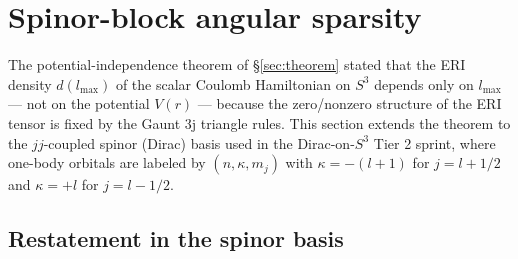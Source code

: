 
\section{Spinor-block angular sparsity}
\label{sec:paper22_spinor}

The potential-independence theorem of \S\ref{sec:theorem} stated that
the ERI density $d(l_{\max})$ of the scalar Coulomb Hamiltonian on
$S^3$ depends only on $l_{\max}$ --- not on the potential $V(r)$ ---
because the zero/nonzero structure of the ERI tensor is fixed by the
Gaunt 3j triangle rules. This section extends the theorem to the
$jj$-coupled spinor (Dirac) basis used in the Dirac-on-$S^3$ Tier 2
sprint, where one-body orbitals are labeled by $(n, \kappa, m_j)$ with
$\kappa = -(l+1)$ for $j = l + 1/2$ and $\kappa = +l$ for $j = l - 1/2$.

\subsection{Restatement in the spinor basis}

